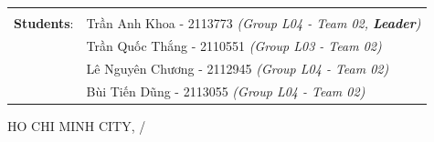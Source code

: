 \documentclass[a4paper, 11pt]{article}
\begin{document}
\begin{titlepage}
\begin{table}[h]
\begin{tabular}{rl}
                               &                                                                       \\[10pt]
            \textbf{Students}: & Trần Anh Khoa - 2113773 \emph{(Group L04 - Team 02, \textbf{Leader})} \\
                               & Trần Quốc Thắng - 2110551 \emph{(Group L03 - Team 02)}                \\
                               & Lê Nguyên Chương - 2112945 \emph{(Group L04 - Team 02)}               \\
                               & Bùi Tiến Dũng - 2113055 \emph{(Group L04 - Team 02)}                  \\
        \end{tabular}
    \end{table}

    \begin{center}
        {\footnotesize HO CHI MINH CITY, \the\month/\the\year}
    \end{center}
\end{titlepage}

\pagebreak
\tableofcontents
\pagebreak

\printunsrtglossary[type={symbols}, title={List of Symbols}]
\printunsrtglossary[type={abbreviations}, title={List of Acronyms}]
\pagebreak
\listoffigures
\listoftables
\pagebreak
{}


\end{document}
